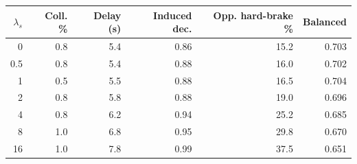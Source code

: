 \begin{tabular}{rrrrrr}
\toprule
$\lambda_s$ & Coll. \% & Delay (s) & Induced dec. & Opp. hard-brake \% & Balanced \\
\midrule
0 & 0.8 & 5.4 & 0.86 & 15.2 & 0.703 \\
0.5 & 0.8 & 5.4 & 0.88 & 16.0 & 0.702 \\
1 & 0.5 & 5.5 & 0.88 & 16.5 & 0.704 \\
2 & 0.8 & 5.8 & 0.88 & 19.0 & 0.696 \\
4 & 0.8 & 6.2 & 0.94 & 25.2 & 0.685 \\
8 & 1.0 & 6.8 & 0.95 & 29.8 & 0.670 \\
16 & 1.0 & 7.8 & 0.99 & 37.5 & 0.651 \\
\bottomrule
\end{tabular}
